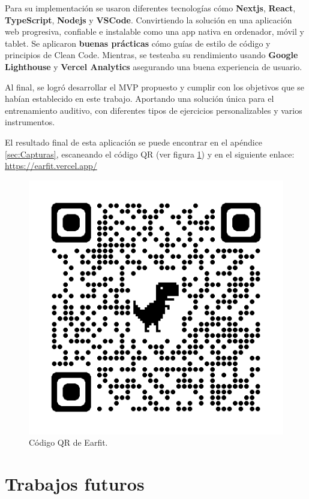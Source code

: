 \documentclass[12pt,twoside,titlepage]{report}
\begin{document}
{Para su implementación se usaron diferentes tecnologías cómo \textbf{Nextjs}, \textbf{React}, \textbf{TypeScript}, \textbf{Nodejs} y \textbf{VSCode}. Convirtiendo la solución en una aplicación web progresiva, confiable e instalable como una app nativa en ordenador, móvil y tablet. Se aplicaron \textbf{buenas prácticas} cómo guías de estilo de código y principios de Clean Code. Mientras, se testeaba su rendimiento usando \textbf{Google Lighthouse} y \textbf{Vercel Analytics} asegurando una buena experiencia de usuario.

Al final, se logró desarrollar el MVP propuesto y cumplir con los objetivos que se habían establecido en este trabajo. Aportando una solución única para el entrenamiento auditivo, con diferentes tipos de ejercicios personalizables y varios instrumentos. 

El resultado final de esta aplicación se puede encontrar en el apéndice \ref{sec:Capturas}, escaneando el código QR (ver figura \ref{fig:EarfitQR}) y en el siguiente enlace: \url{https://earfit.vercel.app/}

\begin{figure}[H]
    \centering
    \includegraphics[scale=0.25]{Conclusiones/EarfitQR}
    \caption{Código QR de Earfit.}
    \label{fig:EarfitQR}
\end{figure}

\section{Trabajos futuros}

}
\end{document}
